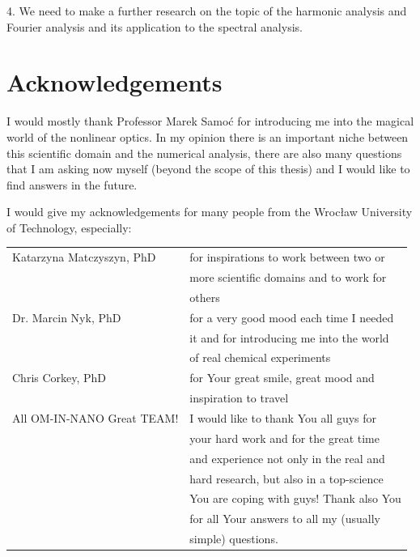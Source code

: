 \documentclass[12pt,twoside,a4paper]{article}
\numberwithin{equation}{subsection}
\numberwithin{figure}{subsection}
\begin{document}
4. We need to make a further research on the topic of the harmonic analysis and Fourier analysis and its application to the spectral analysis.

\section{Acknowledgements} \label{chap:acknowledgements}

I would mostly thank Professor Marek Samoć for introducing me into the magical world of the nonlinear optics. In my opinion there is an important niche between this scientific domain and the numerical analysis, there are also many questions that I am asking now myself (beyond the scope of this thesis) and I would like to find answers in the future.


I would give my acknowledgements for many people from the Wrocław University of Technology, especially:


\begin{tabular}{l l}
	Katarzyna Matczyszyn, PhD  & for inspirations to work between two or \\
	                           & more scientific domains and to work for \\ 
	                           & others \\ 
	Dr. Marcin Nyk, PhD        & for a very good mood each time I needed \\
	                           & it and for introducing me into the world \\
	                           & of real chemical experiments \\
	Chris Corkey, PhD          & for Your great smile, great mood and \\
	                           & inspiration to travel \\
	All OM-IN-NANO Great TEAM! & I would like to thank You all guys for \\ 
	                           & your hard work and for the great time \\
	                           & and experience not only in the real and \\
	                           & hard research, but also in a top-science \\
	                           & You are coping with guys! Thank also You \\
	                           & for all Your answers to all my (usually \\
	                           & simple) questions. \\
\end{tabular}
\end{document}
